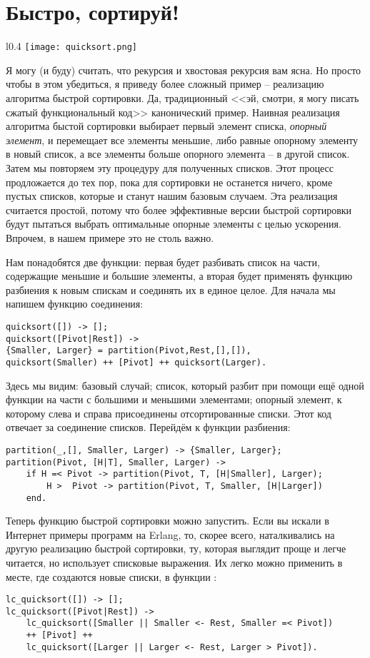 \section{Быстро, сортируй!}
\begin{wrapfigure}{l}{0.4\linewidth}
    \texttt{[image: quicksort.png]}
\end{wrapfigure}
Я могу (и буду) считать, что рекурсия и хвостовая рекурсия вам ясна. Но просто чтобы в этом убедиться, я приведу более сложный пример \--- реализацию алгоритма быстрой сортировки. Да, традиционный <<эй, смотри, я могу писать сжатый функциональный код>> канонический пример. Наивная реализация алгоритма быстой сортировки выбирает первый элемент списка, \emph{опорный элемент}, и перемещает все элементы меньшие, либо равные опорному элементу в новый список, а все элементы больше опорного элемента \--- в другой список. Затем мы повторяем эту процедуру для полученных списков. Этот процесс продложается до тех пор, пока для сортировки не останется ничего, кроме пустых списков, которые и станут нашим базовым случаем. Эта реализация считается простой, потому что более эффективные версии быстрой сортировки будут пытаться выбрать оптимальные опорные элементы с целью ускорения. Впрочем, в нашем примере это не столь важно.

Нам понадобятся две функции: первая будет разбивать список на части, содержащие меньшие и большие элементы, а вторая будет применять функцию разбиения к новым спискам и соединять их в единое целое. Для начала мы напишем функцию соединения:
\begin{lstlisting}[style=erlang]
quicksort([]) -> [];
quicksort([Pivot|Rest]) ->
{Smaller, Larger} = partition(Pivot,Rest,[],[]),
quicksort(Smaller) ++ [Pivot] ++ quicksort(Larger).
\end{lstlisting}

Здесь мы видим: базовый случай; список, который разбит при помощи ещё одной функции на части с большими и меньшими элементами; опорный элемент, к которому слева и справа присоединены отсортированные списки. Этот код отвечает за соединение списков. Перейдём к функции разбиения:
\begin{lstlisting}[style=erlang]
partition(_,[], Smaller, Larger) -> {Smaller, Larger};
partition(Pivot, [H|T], Smaller, Larger) ->
    if H =< Pivot -> partition(Pivot, T, [H|Smaller], Larger);
        H >  Pivot -> partition(Pivot, T, Smaller, [H|Larger])
    end.
\end{lstlisting}

Теперь функцию быстрой сортировки можно запустить. Если вы искали в Интернет примеры программ на Erlang, то, скорее всего, наталкивались на другую реализацию быстрой сортировки, ту, которая выглядит проще и легче читается, но использует списковые выражения. Их легко можно применить в месте, где создаются новые списки, в функции :
\begin{lstlisting}[style=erlang]
lc_quicksort([]) -> [];
lc_quicksort([Pivot|Rest]) ->
    lc_quicksort([Smaller || Smaller <- Rest, Smaller =< Pivot])
    ++ [Pivot] ++
    lc_quicksort([Larger || Larger <- Rest, Larger > Pivot]).
\end{lstlisting}

